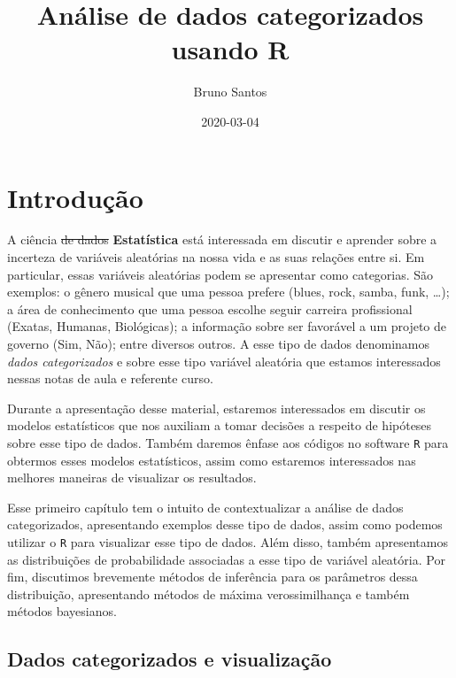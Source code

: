 \documentclass[]{book}
\title{Análise de dados categorizados usando R}
\author{Bruno Santos}
\date{2020-03-04}
\begin{document}
\maketitle

{
\setcounter{tocdepth}{1}
\tableofcontents
}
\hypertarget{introducao}{%
\chapter{Introdução}\label{introducao}}

A ciência \sout{de dados} \textbf{Estatística} está interessada em discutir e aprender sobre a incerteza de variáveis aleatórias na nossa vida e as suas relações entre si. Em particular, essas variáveis aleatórias podem se apresentar como categorias. São exemplos: o gênero musical que uma pessoa prefere (blues, rock, samba, funk, \ldots{}); a área de conhecimento que uma pessoa escolhe seguir carreira profissional (Exatas, Humanas, Biológicas); a informação sobre ser favorável a um projeto de governo (Sim, Não); entre diversos outros. A esse tipo de dados denominamos \emph{dados categorizados} e sobre esse tipo variável aleatória que estamos interessados nessas notas de aula e referente curso.

Durante a apresentação desse material, estaremos interessados em discutir os modelos estatísticos que nos auxiliam a tomar decisões a respeito de hipóteses sobre esse tipo de dados. Também daremos ênfase aos códigos no software \texttt{R} para obtermos esses modelos estatísticos, assim como estaremos interessados nas melhores maneiras de visualizar os resultados.

Esse primeiro capítulo tem o intuito de contextualizar a análise de dados categorizados, apresentando exemplos desse tipo de dados, assim como podemos utilizar o \texttt{R} para visualizar esse tipo de dados. Além disso, também apresentamos as distribuições de probabilidade associadas a esse tipo de variável aleatória. Por fim, discutimos brevemente métodos de inferência para os parâmetros dessa distribuição, apresentando métodos de máxima verossimilhança e também métodos bayesianos.

\hypertarget{dados-categorizados-e-visualizacao}{%
\section{Dados categorizados e visualização}\label{dados-categorizados-e-visualizacao}}
\end{document}
